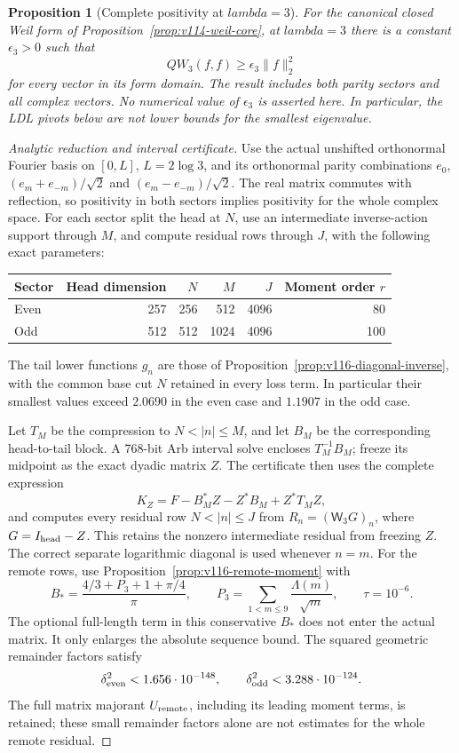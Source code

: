 \documentclass[11pt]{article}
\def\lambda{lambda}%
\newtheorem{proposition}[theorem]{Proposition}
\theoremstyle{remark}
\begin{document}
\begin{proposition}[Complete positivity at $\lambda=3$]
\label{prop:v116-window-positive}
For the canonical closed Weil form of
Proposition~\ref{prop:v114-weil-core}, at $\lambda=3$ there is a
constant $\epsilon_3>0$ such that
\[
 QW_3(f,f)\ge\epsilon_3\|f\|_2^2
\]
for every vector in its form domain. The result includes both parity
sectors and all complex vectors. No numerical value of $\epsilon_3$
is asserted here. In particular, the LDL pivots below are not lower
bounds for the smallest eigenvalue.
\end{proposition}
\begin{proof}[Analytic reduction and interval certificate]
Use the actual unshifted orthonormal Fourier basis on $[0,L]$,
$L=2\log3$, and its orthonormal parity combinations
$e_0$, $(e_m+e_{-m})/\sqrt2$ and
$(e_m-e_{-m})/\sqrt2$. The real matrix commutes with reflection, so
positivity in both sectors implies positivity for the whole complex
space. For each sector split the head at $N$, use an intermediate
inverse-action support through $M$, and compute residual rows through
$J$, with the following exact parameters:
\begin{center}
\begin{tabular}{lrrrrr}
\toprule
Sector & Head dimension & $N$ & $M$ & $J$ & Moment order $r$\\
\midrule
Even &257&256&512&4096&80\\
Odd  &512&512&1024&4096&100\\
\bottomrule
\end{tabular}
\end{center}
The tail lower functions $g_n$ are those of
Proposition~\ref{prop:v116-diagonal-inverse}, with the common base cut $N$
retained in every loss term. In particular their smallest values exceed
$2.0690$ in the even case and $1.1907$ in the odd case.

Let $T_M$ be the compression to $N<|n|\le M$, and let $B_M$ be the
corresponding head-to-tail block. A 768-bit Arb interval solve encloses
$T_M^{-1}B_M$; freeze its midpoint as the exact dyadic matrix $Z$.
The certificate then uses the complete expression
\[
 K_Z=F-B_M^*Z-Z^*B_M+Z^*T_MZ,
\]
and computes every residual row $N<|n|\le J$ from
$R_n=(\mathsf W_3G)_n$, where $G=I_{\rm head}-Z$.
This retains the nonzero intermediate residual from freezing $Z$.
The correct separate logarithmic diagonal is used whenever $n=m$.
For the remote rows, use
Proposition~\ref{prop:v116-remote-moment} with
\[
 B_* =\frac{4/3+P_3+1+\pi/4}{\pi},\qquad
 P_3=\sum_{1<m\le9}\frac{\Lambda(m)}{\sqrt m},\qquad
 \tau=10^{-6}.
\]
The optional full-length term in this conservative $B_*$ does not
enter the actual matrix. It only enlarges the absolute sequence bound.
The squared geometric remainder factors satisfy
\[
 \delta^2_{\rm even}<1.656\cdot10^{-148},\qquad
 \delta^2_{\rm odd}<3.288\cdot10^{-124}.
\]
The full matrix majorant $U_{\rm remote}$, including its leading
moment terms, is retained; these small remainder factors alone are not
estimates for the whole remote residual.


\end{proof}
\end{document}
